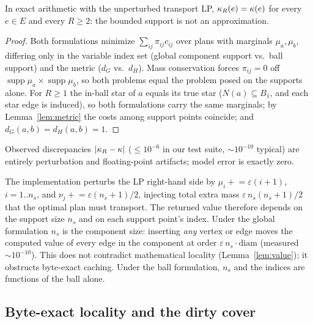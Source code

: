 \begin{lemma}\label{lem:value}
In exact arithmetic with the unperturbed transport LP, $\kappa_R(e) = \kappa(e)$
for every $e \in E$ and every $R \ge 2$: the bounded support is not an
approximation.
\end{lemma}

\begin{proof}
Both formulations minimize $\sum_{ij} \pi_{ij} c_{ij}$ over plans with
marginals $\mu_a, \mu_b$, differing only in the variable index set (global
component support vs.\ ball support) and the metric ($d_G$ vs.\ $d_H$). Mass
conservation forces $\pi_{ij}=0$ off $\operatorname{supp}\mu_a \times
\operatorname{supp}\mu_b$, so both problems equal the problem posed on the
supports alone. For $R \ge 1$ the in-ball star of $a$ equals its true star
($N(a) \subseteq B_1$, and each star edge is induced), so both formulations
carry the same marginals; by Lemma~\ref{lem:metric} the costs among support
points coincide; and $d_G(a,b)=d_H(a,b)=1$.
\end{proof}

\begin{corollary}
Observed discrepancies $|\kappa_R - \kappa|$ ($\le 10^{-6}$ in our test suite,
${\sim}10^{-10}$ typical) are entirely perturbation and floating-point
artifacts; model error is exactly zero.
\end{corollary}

\begin{observation}\label{obs:nonlocal}
The implementation perturbs the LP right-hand side by
$\mu_i \mathrel{+}= \varepsilon(i{+}1)$, $i = 1..n_s$, and
$\nu_j \mathrel{+}= \varepsilon(n_s{+}1)/2$, injecting total extra mass
$\varepsilon\, n_s(n_s{+}1)/2$ that the optimal plan must transport. The
returned value therefore depends on the support size $n_s$ and on each
support point's index. Under the global formulation $n_s$ is the component
size: inserting \emph{any} vertex or edge moves the computed value of every
edge in the component at order $\varepsilon\, n_s\!\cdot\!\mathrm{diam}$
(measured ${\sim}10^{-10}$). This does not contradict mathematical locality
(Lemma~\ref{lem:value}); it obstructs byte-exact caching. Under the ball
formulation, $n_s$ and the indices are functions of the ball alone.
\end{observation}

\subsection{Byte-exact locality and the dirty cover}


